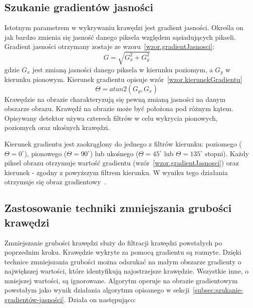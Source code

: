 \documentclass[a4paper,twoside,12pt]{book}
\begin{document}
    \subsection*{Szukanie gradientów jasności}\label{subsec:szukanie-gradientów-jasności}
    Istotnym parametrem w wykrywaniu krawędzi jest gradient jasności.
    Określa on jak bardzo zmienia się jasność danego piksela względem sąsiadujących pikseli.
    Gradient jasności otrzymany zostaje ze wzoru~\ref{wzor.gradientJasnosci}:
    \large
    \begin{equation}
        G = \sqrt{G_{x}^{2} + G_{y}^{2}}
        \label{wzor.gradientJasnosci}
    \end{equation}
    \normalsize
    gdzie $G_{x}$ jest zmianą jasności danego piksela w kierunku poziomym, a $G_{y}$ w kierunku pionowym.
    Kierunek gradientu opisuje wzór~\ref{wzor.kierunekGradientu}
    \large
    \begin{equation}
        \Theta = atan2(G_{y}, G_{x})
        \label{wzor.kierunekGradientu}
    \end{equation}
    \normalsize
    Krawędzie na obrazie charakteryzują się pewną zmianą jasności na danym obszarze obrazu.
    Krawędź na obrazie może być położona pod różnym kątem.
    Opisywany detektor używa czterech filtrów w celu wykrycia pionowych, poziomych oraz ukośnych krawędzi.

    Kierunek gradientu jest zaokrąglony do jednego z filtrów kierunku: poziomego ($\Theta = 0^{\circ}$),
    pionowego ($\Theta = 90^{\circ}$) lub ukośnego ($\Theta = 45^{\circ}$
    lub $\Theta = 135^{\circ}$ stopni).
    Każdy piksel obrazu otrzymuje wartość gradientu (wzór~\ref{wzor.gradientJasnosci})
    oraz kierunek - zgodny z powyższym filtrem kierunku.
    W wyniku tego działania otrzymuje się obraz gradientowy~\cite{Canny}.
    \subsection*{Zastosowanie techniki zmniejszania grubości krawędzi}
    Zmniejszanie grubości krawędzi służy do filtracji krawędzi powstałych po poprzednim kroku.
    Krawędzie wykryte za pomocą gradientu są rozmyte.
    Dzięki technice zmniejszania grubości można odszukać na małym obszarze gradienty o największej wartości,
    które identyfikują najostrzejsze krawędzie.
    Wszystkie inne, o mniejszej wartości, są ignorowane.
    Algorytm operuje na obrazie gradientowym powstałym jako wynik działania algorytmu opisanego w
    sekcji~\ref{subsec:szukanie-gradientów-jasności}.
    Działa on następująco:
\end{document}
